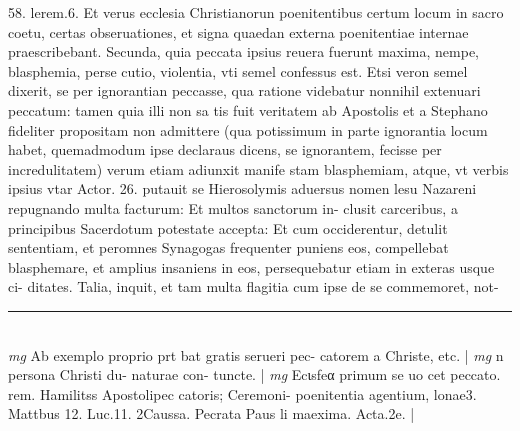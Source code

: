\documentclass{article}
\begin{document}
\begin{pages}
58. lerem.6. Et verus ecclesia Christianorun poenitentibus certum locum in sacro coetu, certas obseruationes, et signa quaedan externa poenitentiae internae praescribebant.  \pend\pstart Secunda, quia peccata ipsius reuera fuerunt maxima, nempe, blasphemia, perse cutio, violentia, vti semel confessus est. Etsi veron semel dixerit, se per ignorantian peccasse, qua ratione videbatur nonnihil extenuari peccatum: tamen quia illi non sa tis fuit veritatem ab Apostolis et a Stephano fideliter propositam non admittere (qua potissimum in parte ignorantia locum habet, quemadmodum ipse declaraus dicens, se ignorantem, fecisse per incredulitatem) verum etiam adiunxit manife stam blasphemiam, atque, vt verbis ipsius vtar Actor. 26. putauit se Hierosolymis aduersus nomen lesu Nazareni repugnando multa facturum: Et multos sanctorum in- clusit carceribus, a principibus Sacerdotum potestate accepta: Et cum occiderentur, detulit sententiam, et peromnes Synagogas frequenter puniens eos, compellebat blasphemare, et amplius insaniens in eos, persequebatur etiam in exteras usque ci- ditates. Talia, inquit, et tam multa flagitia cum ipse de se commemoret, not-  \pend
\vspace{0.5cm}\noindent
\vspace{0.2cm}\rule{1cm}{0.2pt}\\ 
\hspace{0.2cm}\textit{mg}
\footnotesize Ab exemplo proprio prt bat gratis serueri pec- catorem a Christe, etc. 
\normalsize| 
\hspace{0.2cm}\textit{mg}
\footnotesize n persona Christi du- naturae con- tuncte. 
\normalsize| 
\hspace{0.2cm}\textit{mg}
\footnotesize Ecιsfeα primum se uo cet peccato. rem. Hamilitss Apostolipec catoris; Ceremoni- poenitentia agentium, lonae3. Mattbus 12. Luc.11. 2Caussa. Pecrata Paus li maexima. Acta.2e. 
\normalsize| 

\end{pages}
\end{document}
